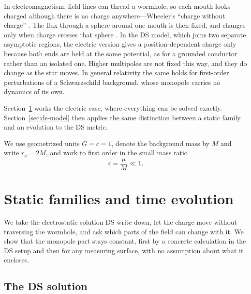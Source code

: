 \documentclass[aps,prd,10pt,onecolumn,nofootinbib,superscriptaddress,floatfix]{revtex4-2}
\begin{document}
In electromagnetism, field lines can thread a wormhole, so each mouth looks
charged although there is no charge anywhere---Wheeler's ``charge without charge''
\cite{MisnerWheeler1957ClassicalPhysics}.  The flux through a sphere around one
mouth is then fixed, and changes only when charge crosses that sphere
\cite{FrolovNovikov1990PhysicalEffects}.  In
the DS model, which joins two separate asymptotic regions, the electric
version gives a position-dependent charge only because both ends are held at
the same potential, as for a grounded conductor rather than an isolated one.  Higher
multipoles are not fixed this way, and they do change as the star moves.  In general
relativity the same holds for first-order perturbations of a Schwarzschild
background, whose monopole carries no dynamics of its own.

Section~\ref{sec:maxwell} works the electric case, where everything can be
solved exactly.  Section~\ref{sec:ds-model} then applies the same distinction
between a static family and an evolution to the DS metric.

We use geometrized units $G=c=1$, denote the background mass by $M$ and write
$r_g=2M$, and work to first order in the small mass ratio
\begin{equation}
  \epsilon=\frac{\mu}{M}\ll1.
\end{equation}

\section{Static families and time evolution}
\label{sec:maxwell}

We take the electrostatic solution DS write down, let the charge move without
traversing the wormhole, and ask which parts of the field can change with it.
We show that the monopole part stays constant, first by a concrete
calculation in the DS setup and then for any measuring surface, with no
assumption about what it encloses.

\subsection{The DS solution}
\end{document}
